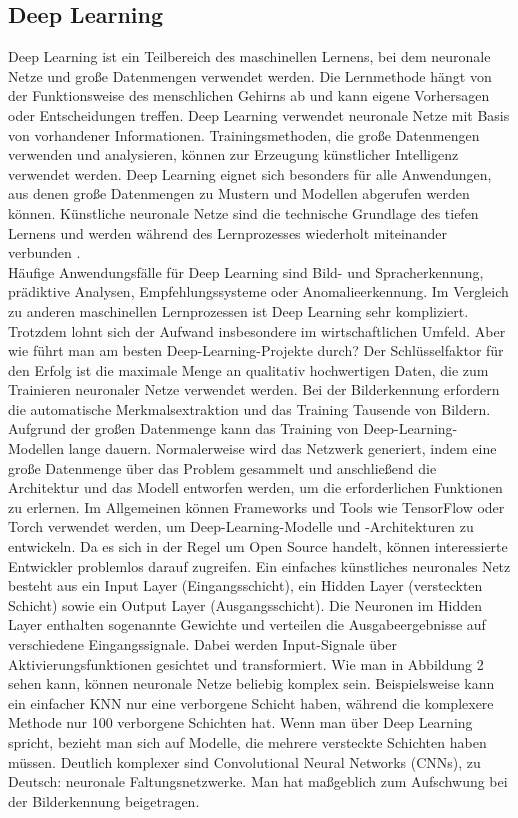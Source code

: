 \documentclass[a4paper,11pt]{article}
\theoremstyle{mytheor}
\begin{document}
\subsection{Deep Learning}
Deep Learning ist ein Teilbereich des maschinellen Lernens, bei dem neuronale Netze und große Datenmengen verwendet werden. Die Lernmethode hängt von der Funktionsweise des menschlichen Gehirns ab und kann eigene Vorhersagen oder Entscheidungen treffen. Deep Learning verwendet neuronale Netze mit Basis von vorhandener Informationen. Trainingsmethoden, die große Datenmengen verwenden und analysieren, können zur Erzeugung künstlicher Intelligenz verwendet werden. Deep Learning eignet sich besonders für alle Anwendungen, aus denen große Datenmengen zu Mustern und Modellen abgerufen werden können. Künstliche neuronale Netze sind die technische Grundlage des tiefen Lernens und werden während des Lernprozesses wiederholt miteinander verbunden  \cite{deep}.\\
Häufige Anwendungsfälle für Deep Learning sind Bild- und Spracherkennung, prädiktive Analysen, Empfehlungssysteme oder Anomalieerkennung.
Im Vergleich zu anderen maschinellen Lernprozessen ist Deep Learning sehr kompliziert. Trotzdem lohnt sich der Aufwand insbesondere im wirtschaftlichen Umfeld. Aber wie führt man am besten Deep-Learning-Projekte durch? Der Schlüsselfaktor für den Erfolg ist die maximale Menge an qualitativ hochwertigen Daten, die zum Trainieren neuronaler Netze verwendet werden. Bei der Bilderkennung erfordern die automatische Merkmalsextraktion und das Training Tausende von Bildern. Aufgrund der großen Datenmenge kann das Training von Deep-Learning-Modellen lange dauern. Normalerweise wird das Netzwerk generiert, indem eine große Datenmenge über das Problem gesammelt und anschließend die Architektur und das Modell entworfen werden, um die erforderlichen Funktionen zu erlernen. Im Allgemeinen können Frameworks und Tools wie TensorFlow oder Torch verwendet werden, um Deep-Learning-Modelle und -Architekturen zu entwickeln. Da es sich in der Regel um Open Source handelt, können interessierte Entwickler problemlos darauf zugreifen.
Ein einfaches künstliches neuronales Netz besteht aus ein Input Layer (Eingangsschicht), ein Hidden Layer (versteckten Schicht) sowie ein Output Layer (Ausgangsschicht). Die Neuronen im Hidden Layer enthalten sogenannte Gewichte und verteilen die Ausgabeergebnisse auf verschiedene Eingangssignale. Dabei werden Input-Signale über Aktivierungsfunktionen gesichtet und transformiert. Wie man in Abbildung 2 sehen kann, können neuronale Netze beliebig komplex sein. Beispielsweise kann ein einfacher KNN nur eine verborgene Schicht haben, während die komplexere Methode nur 100 verborgene Schichten hat. Wenn man über Deep Learning spricht, bezieht man sich auf Modelle, die mehrere versteckte Schichten haben müssen\cite{deep2}.
Deutlich komplexer sind Convolutional Neural Networks (CNNs), zu Deutsch:
neuronale Faltungsnetzwerke. Man hat maßgeblich zum Aufschwung bei der
Bilderkennung beigetragen.
\end{document}
